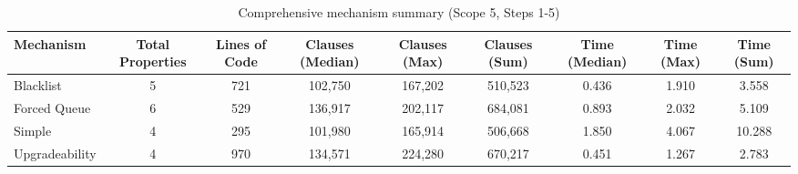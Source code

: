 \begin{table}[htbp]
\centering
\begin{tabular}{|l|c|c|c|c|c|c|c|c|}
\hline
\textbf{Mechanism} & \textbf{Total Properties} & \textbf{Lines of Code} & \textbf{Clauses (Median)} & \textbf{Clauses (Max)} & \textbf{Clauses (Sum)} & \textbf{Time (Median)} & \textbf{Time (Max)} & \textbf{Time (Sum)} \\
\hline
Blacklist & 5 & 721 & 102,750 & 167,202 & 510,523 & 0.436 & 1.910 & 3.558 \\
Forced Queue & 6 & 529 & 136,917 & 202,117 & 684,081 & 0.893 & 2.032 & 5.109 \\
Simple & 4 & 295 & 101,980 & 165,914 & 506,668 & 1.850 & 4.067 & 10.288 \\
Upgradeability & 4 & 970 & 134,571 & 224,280 & 670,217 & 0.451 & 1.267 & 2.783 \\
\hline
\end{tabular}
\caption{Comprehensive mechanism summary (Scope 5, Steps 1-5)}
\label{tab:comprehensive_mechanism_summary_steps_5}
\end{table}